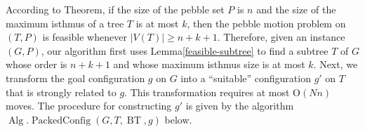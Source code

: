 \documentclass[letter,11pt]{article}
\theoremstyle{definition}
\theoremstyle{definition}
\DeclareMathOperator{\BT}{BT}
\DeclareMathOperator{\Alg}{Alg}
\DeclareMathOperator{\PacCon}{PackedConfig}
\newcommand{\1}{\boldmath$~1~$\unboldmath}
\newcommand{\Ord}{\mathrm{O}}
\newcommand{\tume}{\hspace*{0.2em}}
\begin{document}
According to Theorem\tume{A}, if the size of the pebble set $P$ is $n$ and the
size of the maximum isthmus of a tree $T$ is at most $k$, then the
pebble motion problem on $(T,P)$ is feasible whenever $|V(T)| \geq n+k+1$.
Therefore, given an instance $(G,P)$, our algorithm first uses
Lemma\tume\ref{feasible-subtree} to find a subtree $T$ of $G$ whose order
is $n+k+1$ and whose maximum isthmus size is at most $k$.
Next, we transform the goal configuration $g$ on $G$ into a
``suitable'' configuration $g'$ on $T$ that is strongly related to $g$.
This transformation requires at most $\Ord(Nn)$ moves.
The procedure for constructing $g'$ is given by the algorithm
$\Alg.\PacCon(G,T,\BT,g)$ below.
\end{document}

